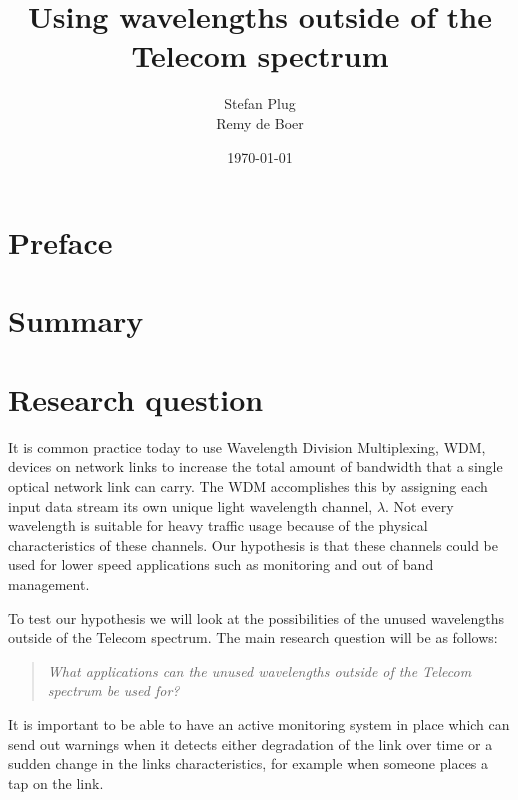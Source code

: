 \documentclass{article}
\begin{document}
\title{Using wavelengths outside of the Telecom spectrum}
\author{Stefan Plug\\Remy de Boer}
\date{\today}
\maketitle

\tableofcontents
\newpage

\section{Preface}
\newpage
\section{Summary}
\newpage
\section{Research question}
It is common practice today to use Wavelength Division Multiplexing, WDM, devices on network links to increase the total amount of bandwidth that a single optical network link can carry. The WDM accomplishes this by assigning each input data stream its own unique light wavelength channel, $\lambda$. 
Not every wavelength is suitable for heavy traffic usage because of the physical characteristics of these channels. Our hypothesis is that these channels could be used for lower speed applications such as monitoring and out of band management.

To test our hypothesis we will look at the possibilities of the unused wavelengths outside of the Telecom spectrum.
The main research question will be as follows:
\begin{quote}
\textit{
What applications can the unused wavelengths outside of the Telecom spectrum be used for?
}
\end{quote}

It is important to be able to have an active monitoring system in place which can send out warnings when it detects either degradation of the link over time or a sudden change in the links characteristics, for example when someone places a tap on the link. 
\end{document}
